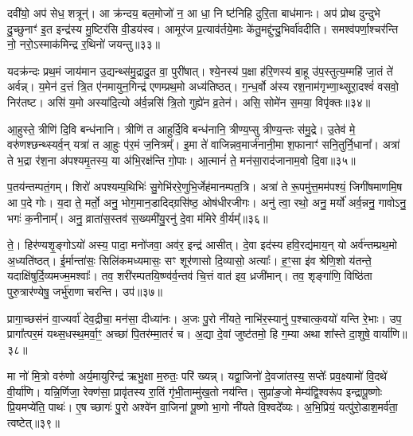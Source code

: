 दवी॑यो॒ अप॑ सेध॒ शत्रून्॑। आ क्र॑न्दय॒ बल॒मोजो॑ न॒ आ धा॒ नि ष्ट॑निहि दुरि॒ता बाध॑मानः। अप॑ प्रोथ दुन्दुभे दु॒च्छुनाꣳ॑ इ॒त इन्द्र॑स्य मु॒ष्टिर॑सि वी॒डय॑स्व। आमूर॑ज प्र॒त्याव॑र्तये॒माः के॑तु॒मद्दु॑न्दु॒भिर्वा॑वदीति। समश्व॑पर्णा॒श्चर॑न्ति नो॒ नरो॒\-ऽस्माक॑मिन्द्र र॒थिनो॑ जयन्तु॥३३॥

{\anuvakamend[{धन्व॑न्महि॒मानं॒ ब्राह्म॑णा॒सो\-ऽदि॑तिः पृथि॒व्याः परि॑ दू॒रादेक॑चत्वारिꣳशच्च॥६॥}]}

यदक्र॑न्दः प्रथ॒मं जाय॑मान उ॒द्यन्थ्स॑मु॒द्रादु॒त वा॒ पुरी॑षात्। श्ये॒नस्य॑ प॒क्षा ह॑रि॒णस्य॑ बा॒हू उ॑प॒स्तुत्य॒म्महि॑ जा॒तं ते॑ अर्वन्न्। य॒मेन॑ द॒त्तं त्रि॒त ए॑नमायुन॒गिन्द्र॑ एणम्प्रथ॒मो अध्य॑तिष्ठत्। ग॒न्ध॒र्वो अ॑स्य रश॒नाम॑गृभ्णा॒थ्सूरा॒दश्वं॑ वसवो॒ निर॑तष्ट। असि॑ य॒मो अस्या॑दि॒त्यो अ॑र्व॒न्नसि॑ त्रि॒तो गुह्ये॑न व्र॒तेन॑। असि॒ सोमे॑न स॒मया॒ विपृ॑क्तः॥३४॥

आ॒हुस्ते॒ त्रीणि॑ दि॒वि बन्ध॑नानि। त्रीणि॑ त आहुर्दि॒वि बन्ध॑नानि॒ त्रीण्य॒प्सु त्रीण्य॒न्तः स॑मु॒द्रे। उ॒तेव॑ मे॒ वरु॑णश्छन्थ्स्यर्व॒न् यत्रा॑ त आ॒हुः प॑र॒मं ज॒नित्रम्᳚। इ॒मा ते॑ वाजिन्नव॒मार्ज॑नानी॒मा श॒फानाꣳ॑ सनि॒तुर्नि॒धाना᳚। अत्रा॑ ते भ॒द्रा र॑श॒ना अ॑पश्यमृ॒तस्य॒ या अ॑भि॒रक्ष॑न्ति गो॒पाः। आ॒त्मानं॑ ते॒ मन॑सा॒राद॑जानाम॒वो दि॒वा॥३५॥

प॒तय॑न्तम्पतं॒गम्। शिरो॑ अपश्यम्प॒थिभिः॑ सु॒गेभि॑ररे॒णुभि॒र्जेह॑मानम्पत॒त्रि। अत्रा॑ ते रू॒पमु॑त्त॒मम॑पश्यं॒ जिगी॑षमाणमि॒ष आ प॒दे गोः। य॒दा ते॒ मर्तो॒ अनु॒ भोग॒मान॒डादिद्ग्रसि॑ष्ठ॒ ओष॑धीरजीगः। अनु॑ त्वा॒ रथो॒ अनु॒ मर्यो॑ अर्व॒न्ननु॒ गावो\-ऽनु॒ भगः॑ क॒नीनाम्᳚। अनु॒ व्राता॑स॒स्तव॑ स॒ख्यमी॑यु॒रनु॑ दे॒वा म॑मिरे वी॒र्यम्᳚॥३६॥

ते॒। हिर॑ण्यशृ॒ङ्गो\-ऽयो॑ अस्य॒ पादा॒ मनो॑जवा॒ अव॑र॒ इन्द्र॑ आसीत्। दे॒वा इद॑स्य हवि॒रद्य॑माय॒न् यो अर्व॑न्तम्प्रथ॒मो अ॒ध्यति॑ष्ठत्। ई॒र्मान्ता॑सः॒ सिलि॑कमध्यमासः॒ सꣳ शूर॑णासो दि॒व्यासो॒ अत्याः᳚। ह॒ꣳ॒सा इ॑व श्रेणि॒शो य॑तन्ते॒ यदाक्षि॑षुर्दि॒व्यमज्म॒मश्वाः᳚। तव॒ शरी॑रम्पतयि॒ष्ण्व॑र्व॒न्तव॑ चि॒त्तं वात॑ इव॒ ध्रजी॑मान्। तव॒ शृङ्गा॑णि॒ विष्ठि॑ता पुरु॒त्रार॑ण्येषु॒ जर्भु॑राणा चरन्ति। उप॑॥३७॥

प्रागा॒च्छस॑नं वा॒ज्यर्वा॑ देव॒द्रीचा॒ मन॑सा॒ दीध्या॑नः। अ॒जः पु॒रो नी॑यते॒ नाभि॑र॒स्यानु॑ प॒श्चात्क॒वयो॑ यन्ति रे॒भाः। उप॒ प्रागा᳚त्पर॒मं यथ्स॒धस्थ॒मर्वा॒ꣳ॒ अच्छा॑ पि॒तर॑म्मा॒तरं॑ च। अ॒द्या दे॒वां जुष्ट॑तमो॒ हि ग॒म्या अथा शा᳚स्ते दा॒शुषे॒ वार्या॑णि॥३८॥

{\anuvakamend[{विपृ॑क्तो दि॒वा वी॒र्य॑मुपैका॒न्नच॑त्वारि॒ꣳ॒शच्च॑॥७॥}]}

मा नो॑ मि॒त्रो वरु॑णो अर्य॒मायुरिन्द्र॑ ऋभु॒क्षा म॒रुतः॒ परि॑ ख्यन्न्। यद्वा॒जिनो॑ दे॒वजा॑तस्य॒ सप्तेः᳚ प्रव॒क्ष्यामो॑ वि॒दथे॑ वी॒र्या॑णि। यन्नि॒र्णिजा॒ रेक्ण॑सा॒ प्रावृ॑तस्य रा॒तिं गृ॑भी॒ताम्मु॑ख॒तो नय॑न्ति। सुप्रा॑ङ॒जो मेम्य॑द्वि॒श्वरू॑प इन्द्रापू॒ष्णोः प्रि॒यमप्ये॑ति॒ पाथः॑। ए॒ष च्छागः॑ पु॒रो अश्वे॑न वा॒जिना॑ पू॒ष्णो भा॒गो नी॑यते वि॒श्वदे᳚व्यः। अ॒भि॒प्रियं॒ यत्पु॑रो॒डाश॒मर्व॑ता॒ त्वष्टेत्॥३९॥

